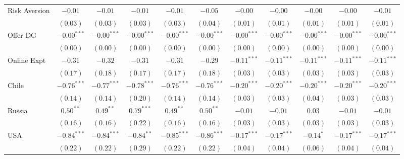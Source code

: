 \begin{table}
\begin{center}
\begin{tabular}{l c c c c c c c c c c }
Risk Aversion      & $-0.01$       & $-0.01$       & $-0.01$       & $-0.01$       & $-0.05$       & $-0.00$       & $-0.00$       & $-0.00$       & $-0.00$       & $-0.01$       \\
                   & $(0.03)$      & $(0.03)$      & $(0.03)$      & $(0.03)$      & $(0.04)$      & $(0.01)$      & $(0.01)$      & $(0.01)$      & $(0.01)$      & $(0.01)$      \\
Offer DG           & $-0.00^{***}$ & $-0.00^{***}$ & $-0.00^{***}$ & $-0.00^{***}$ & $-0.00^{***}$ & $-0.00^{***}$ & $-0.00^{***}$ & $-0.00^{***}$ & $-0.00^{***}$ & $-0.00^{***}$ \\
                   & $(0.00)$      & $(0.00)$      & $(0.00)$      & $(0.00)$      & $(0.00)$      & $(0.00)$      & $(0.00)$      & $(0.00)$      & $(0.00)$      & $(0.00)$      \\
Online Expt        & $-0.31$       & $-0.32$       & $-0.31$       & $-0.31$       & $-0.29$       & $-0.11^{***}$ & $-0.11^{***}$ & $-0.11^{***}$ & $-0.11^{***}$ & $-0.11^{***}$ \\
                   & $(0.17)$      & $(0.18)$      & $(0.17)$      & $(0.17)$      & $(0.18)$      & $(0.03)$      & $(0.03)$      & $(0.03)$      & $(0.03)$      & $(0.03)$      \\
Chile              & $-0.76^{***}$ & $-0.77^{***}$ & $-0.78^{***}$ & $-0.76^{***}$ & $-0.76^{***}$ & $-0.20^{***}$ & $-0.20^{***}$ & $-0.20^{***}$ & $-0.20^{***}$ & $-0.20^{***}$ \\
                   & $(0.14)$      & $(0.14)$      & $(0.20)$      & $(0.14)$      & $(0.14)$      & $(0.03)$      & $(0.03)$      & $(0.04)$      & $(0.03)$      & $(0.03)$      \\
Russia             & $0.50^{**}$   & $0.49^{**}$   & $0.79^{***}$  & $0.49^{**}$   & $0.50^{**}$   & $-0.01$       & $-0.01$       & $0.03$        & $-0.01$       & $-0.01$       \\
                   & $(0.16)$      & $(0.16)$      & $(0.22)$      & $(0.16)$      & $(0.16)$      & $(0.03)$      & $(0.03)$      & $(0.03)$      & $(0.03)$      & $(0.03)$      \\
USA                & $-0.84^{***}$ & $-0.84^{***}$ & $-0.84^{**}$  & $-0.85^{***}$ & $-0.86^{***}$ & $-0.17^{***}$ & $-0.17^{***}$ & $-0.14^{*}$   & $-0.17^{***}$ & $-0.17^{***}$ \\
                   & $(0.22)$      & $(0.22)$      & $(0.29)$      & $(0.22)$      & $(0.22)$      & $(0.04)$      & $(0.04)$      & $(0.06)$      & $(0.04)$      & $(0.04)$      \\

\end{tabular}
\end{center}
\end{table}
